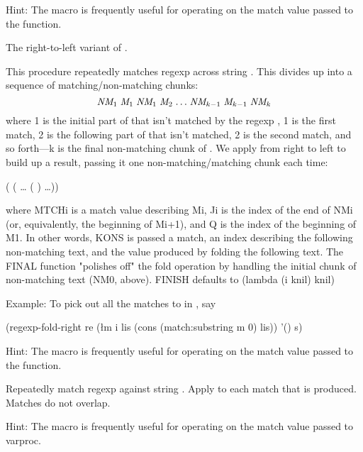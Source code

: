 \begin{desc}
    Hint: The  macro is frequently useful for operating on the 
      match value  passed to the  function.
\end{desc}

\object
\begin{desc}
    The right-to-left variant of .

    This procedure repeatedly matches regexp  across string .
    This divides  up into a sequence of matching/non-matching chunks:
    $$ \mbox{\it{NM}}_{1} \; \mbox{\it{M}}_{1} \; \mbox{\it{NM}}_{1} \; \mbox{\it{M}}_{2} \; {\ldots} \;
                     \mbox{\it{NM}}_{k-1} \; \mbox{\it{M}}_{k-1} \; \mbox{\it{NM}}_{k} $$
%
    where 1 is the initial part of  that isn't matched by
    the regexp , 1 is the
    first match, 2 is the following part of  that
    isn't matched, 2 is the second match, 
    and so forth---k is the final non-matching chunk of
    . 
    We apply  from right to left to build up a result, passing it one
    non-matching/matching chunk each time:
\begin{centercode}
(  (   {\ldots} (   ) \ldots))\end{centercode}%
%
    where MTCHi is a match value describing Mi, Ji is the index of the end of
    NMi (or, equivalently, the beginning of Mi+1), and Q is the index of the
    beginning of M1. In other words, KONS is passed a match, an index
    describing the following non-matching text, and the value produced by
    folding the following text. The FINAL function "polishes off" the fold
    operation by handling the initial chunk of non-matching text (NM0, above).
    FINISH defaults to (lambda (i knil) knil)

    Example: To pick out all the matches to  in , say
\begin{code}
(regexp-fold-right re
                   (\l{m i lis} 
                     (cons (match:substring m 0) lis))
                           '() s)\end{code}%
%
    Hint: The  macro is frequently useful for operating on the 
      match value  passed to the  function.
\end{desc}

\begin{desc}
    Repeatedly match regexp  against string . 
    Apply  to each match that is produced.
    Matches do not overlap.

    Hint: The  macro is frequently useful for operating on the 
      match value  passed to var{proc}.
\end{desc}

